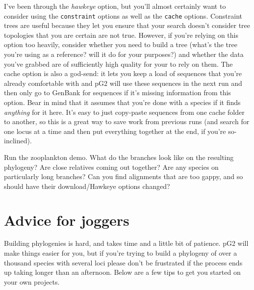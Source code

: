 \documentclass[12pt]{article}
\begin{document}
I've been through the \emph{hawkeye} option, but you'll almost
certainly want to consider using the \texttt{constraint} options as
well as the \texttt{cache} options. Constraint trees are useful
because they let you ensure that your search doesn't consider tree
topologies that you are certain are not true. However, if you're
relying on this option too heavily, consider whether you need to build
a tree (what's the tree you're using as a reference? will it do for
your purposes?) and whether the data you've grabbed are of
sufficiently high quality for your to rely on them. The cache option
is also a god-send: it lets you keep a load of sequences that you're
already comfortable with and pG2 will use these sequences in the next
run and then only go to GenBank for sequences if it's missing
information from this option. Bear in mind that it assumes that you're
done with a species if it finds \emph{anything} for it here. It's easy
to just copy-paste sequences from one cache folder to another, so this
is a great way to save work from previous runs (and search for one
locus at a time and then put everything together at the end, if you're
so-inclined).

Run the zooplankton demo. What do the branches look like on the
resulting phylogeny? Are close relatives coming out together? Are any
species on particularly long branches? Can you find alignments that
are too gappy, and so should have their download/Hawkeye options
changed?

\section*{Advice for joggers}
Building phylogenies is hard, and takes time and a little bit of
patience. pG2 will make things easier for you, but if you're trying to
build a phylogeny of over a thousand species with several loci please
don't be frustrated if the process ends up taking longer than an
afternoon. Below are a few tips to get you started on your own projects.
\end{document}
